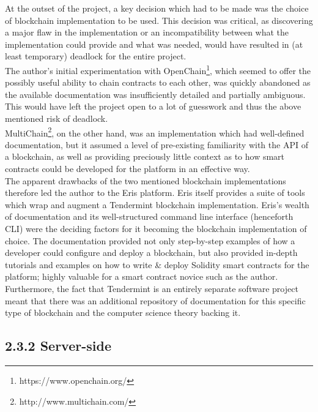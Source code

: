 At the outset of the project, a key decision which had to be made was
the choice of blockchain implementation to be used. This decision was
critical, as discovering a major flaw in the implementation or an
incompatibility between what the implementation could provide and what
was needed, would have resulted in (at least temporary) deadlock for the
entire project.\\
The author's initial experimentation with
OpenChain\footnote{https://www.openchain.org/}, which seemed to
offer the possibly useful ability to chain contracts to each other, was
quickly abandoned as the available documentation was insufficiently
detailed and partially ambiguous. This would have left the project open
to a lot of guesswork and thus the above mentioned risk of deadlock.\\
MultiChain\footnote{http://www.multichain.com/}, on the other
hand, was an implementation which had well-defined documentation, but it
assumed a level of pre-existing familiarity with the API of a
blockchain, as well as providing preciously little context as to how
smart contracts could be developed for the platform in an effective
way.\\
The apparent drawbacks of the two mentioned blockchain implementations
therefore led the author to the
Eris\cite{1erisindustries} platform. Eris itself
provides a suite of tools which wrap and augment a
Tendermint\cite{1tendermint} blockchain
implementation. Eris's wealth of documentation and its well-structured
command line interface (henceforth CLI) were the deciding factors for it
becoming the blockchain implementation of choice. The documentation
provided not only step-by-step examples of how a developer could
configure and deploy a blockchain, but also provided in-depth tutorials
and examples on how to write \& deploy
Solidity\cite{1solidity}
smart contracts for the platform; highly valuable for a smart contract
novice such as the author. Furthermore, the fact that Tendermint is an
entirely separate software project meant that there was an additional
repository of documentation for this specific type of blockchain and the
computer science theory backing it.

\subsection{2.3.2 Server-side}\label{server-side}

